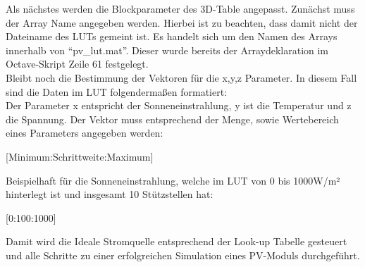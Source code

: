 \documentclass[a4paper,11pt,oneside]{article}
\begin{document}
			Als nächstes werden die Blockparameter des 3D-Table angepasst. Zunächst muss der Array Name angegeben werden. Hierbei ist zu beachten, dass damit nicht der Dateiname des LUTs gemeint ist. Es handelt sich um den Namen des Arrays innerhalb von \enquote{pv\_lut.mat}. Dieser wurde bereits der Arraydeklaration im Octave-Skript Zeile 61 festgelegt.\\
			Bleibt noch die Bestimmung der Vektoren für die x,y,z Parameter. In diesem Fall sind die Daten im LUT folgendermaßen formatiert:\\
			Der Parameter x entspricht der Sonneneinstrahlung, y ist die Temperatur und z die Spannung. Der Vektor muss entsprechend der Menge, sowie Wertebereich eines Parameters angegeben werden:
			\begin{center}
				[Minimum:Schrittweite:Maximum]
			\end{center}
			Beispielhaft für die Sonneneinstrahlung, welche im LUT von 0 bis 1000W/m² hinterlegt ist und insgesamt 10 Stützstellen hat:
			\begin{center}
				[0:100:1000]
			\end{center}
			Damit wird die Ideale Stromquelle entsprechend der Look-up Tabelle gesteuert und alle Schritte zu einer erfolgreichen Simulation eines PV-Moduls durchgeführt.
			
	\newpage
	\printbibliography
\end{document}
